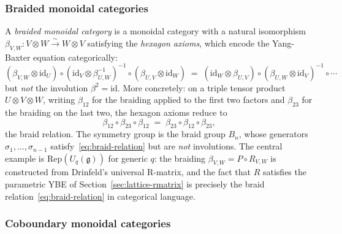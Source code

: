 \subsubsection*{Braided monoidal categories}

A \emph{braided monoidal category} is a monoidal category with a
natural isomorphism $\beta_{V,W} \colon V \otimes W \xrightarrow{\sim}
W \otimes V$ satisfying the \emph{hexagon axioms}, which encode the
Yang-Baxter equation categorically:
\begin{equation}
\label{eq:braid-ybe}
  (\beta_{V,W} \otimes \mathrm{id}_U) \circ
  (\mathrm{id}_V \otimes \beta_{U,W}^{-1})^{-1} \circ
  (\beta_{U,V} \otimes \mathrm{id}_W)
  \;=\;
  (\mathrm{id}_W \otimes \beta_{U,V}) \circ
  (\beta_{U,W} \otimes \mathrm{id}_V)^{-1} \circ \cdots
\end{equation}
but \emph{not} the involution $\beta^2 = \mathrm{id}$.  More
concretely: on a triple tensor product $U \otimes V \otimes W$,
writing $\beta_{12}$ for the braiding applied to the first two factors
and $\beta_{23}$ for the braiding on the last two, the hexagon axioms
reduce to
\begin{equation}
\label{eq:braid-relation}
  \beta_{12} \circ \beta_{23} \circ \beta_{12}
  \;=\;
  \beta_{23} \circ \beta_{12} \circ \beta_{23},
\end{equation}
the braid relation.  The symmetry group is the braid group $B_n$,
whose generators $\sigma_1, \ldots, \sigma_{n-1}$
satisfy~\eqref{eq:braid-relation} but are \emph{not} involutions.
The central example is $\mathrm{Rep}(U_q(\mathfrak{g}))$ for generic
$q$: the braiding $\beta_{V,W} = P \circ R_{V,W}$ is constructed from
Drinfeld's universal R-matrix, and the fact that $R$ satisfies the
parametric YBE of Section~\ref{sec:lattice-rmatrix} is precisely the
braid relation~\eqref{eq:braid-relation} in categorical language.

\subsubsection*{Coboundary monoidal categories}

